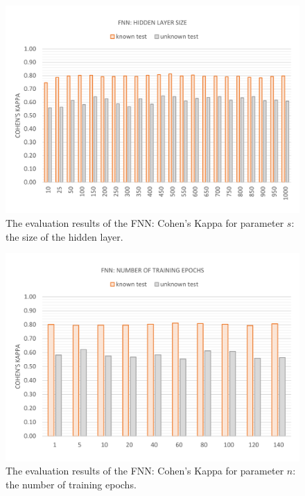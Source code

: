 \vspace{-11mm}
\begin{figure}[H]
	\centering\includegraphics[width=\textwidth]{images/evaluation_fnn_s_k}
	\caption[FNN Evaluation: Hidden Layer Size]{The evaluation results of the FNN: Cohen's Kappa for parameter $s$: the size of the hidden layer.}
	\label{f.evaluation.fnn.s.k}
\end{figure}

\vspace{-11mm}
\begin{figure}[H]
	\centering\includegraphics[width=\textwidth]{images/evaluation_fnn_n_k}
	\caption[FNN Evaluation: Number of Training Epochs]{The evaluation results of the FNN: Cohen's Kappa for parameter $n$: the number of training epochs.}
	\label{f.evaluation.fnn.n.k}
\end{figure}

